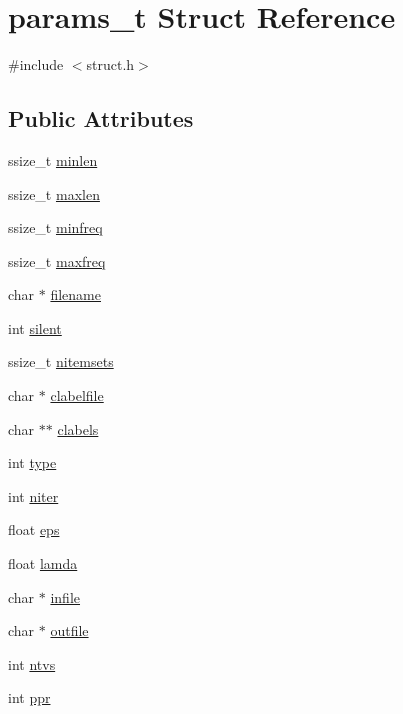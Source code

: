 \hypertarget{a00706}{}\section{params\+\_\+t Struct Reference}
\label{a00706}


{\ttfamily \#include $<$struct.\+h$>$}

\subsection*{Public Attributes}
\begin{DoxyCompactItemize}
\item 
ssize\+\_\+t \hyperlink{a00706_a62fec3324a19ddca57a712e7f149a923}{minlen}
\item 
ssize\+\_\+t \hyperlink{a00706_a5f84610a2797c602d516543cbc6463ca}{maxlen}
\item 
ssize\+\_\+t \hyperlink{a00706_a8f1649ac427eda7975ea030e6dfb045a}{minfreq}
\item 
ssize\+\_\+t \hyperlink{a00706_af444d2c9e2389ae076a5ea654fa17b68}{maxfreq}
\item 
char $\ast$ \hyperlink{a00706_a84a8b430e8ade38c694d0350dae3f523}{filename}
\item 
int \hyperlink{a00706_a972cd57ea33f4f649a58d5eedb18683e}{silent}
\item 
ssize\+\_\+t \hyperlink{a00706_a09cebf1109c096db210409fdce18b5da}{nitemsets}
\item 
char $\ast$ \hyperlink{a00706_a7560743e744e17283074b41f149d29d6}{clabelfile}
\item 
char $\ast$$\ast$ \hyperlink{a00706_ad22c27f7093c714a9d6ad68da2bfef03}{clabels}
\item 
int \hyperlink{a00706_a540f3365a30f0d8b20ba70a920b436b9}{type}
\item 
int \hyperlink{a00706_ab849dd261e8436ebfac71288895d1648}{niter}
\item 
float \hyperlink{a00706_a554919f5352a2dd6c64e8118203e7a76}{eps}
\item 
float \hyperlink{a00706_a1f831fc59e3fc31d12c717af55bd4eee}{lamda}
\item 
char $\ast$ \hyperlink{a00706_a1bbb5e505ab32b4d948ab8f4c1b6df34}{infile}
\item 
char $\ast$ \hyperlink{a00706_ad3a34457b4d06f940afe93f908a592ad}{outfile}
\item 
int \hyperlink{a00706_ab2da6f80957f716f3f7d80bb05359125}{ntvs}
\item 
int \hyperlink{a00706_af0ad708f8ac5a6cd9ab680677b6a320d}{ppr}
$$
\end{DoxyCompactItemize}
